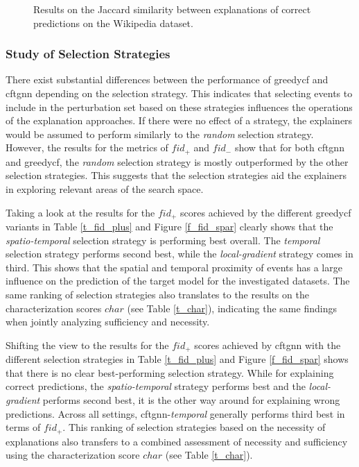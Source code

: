 \begin{figure}[ht]
    \centering
    
    \caption{Results on the Jaccard similarity between explanations of correct predictions on the Wikipedia dataset.}
    \label{f_jaccard_similarity_wiki}
\end{figure}


\FloatBarrier

\subsubsection{Study of Selection Strategies}
\label{s_Evaluation_Results_SelectionStrategies}

There exist substantial differences between the performance of \gls{greedycf} and \gls{cftgnn} depending on the selection strategy. This indicates that selecting events to include in the perturbation set based on these strategies influences the operations of the explanation approaches. If there were no effect of a strategy, the explainers would be assumed to perform similarly to the \textit{random} selection strategy. However, the results for the metrics of $fid_+$ and $fid_-$ show that for both \gls{cftgnn} and \gls{greedycf}, the \textit{random} selection strategy is mostly outperformed by the other selection strategies. This suggests that the selection strategies aid the explainers in exploring relevant areas of the search space.

Taking a look at the results for the $fid_+$ scores achieved by the different \gls{greedycf} variants in Table \ref{t_fid_plus} and Figure \ref{f_fid_spar} clearly shows that the \textit{spatio-temporal} selection strategy is performing best overall. The \textit{temporal} selection strategy performs second best, while the \textit{local-gradient} strategy comes in third. This shows that the spatial and temporal proximity of events has a large influence on the prediction of the target model for the investigated datasets. The same ranking of selection strategies also translates to the results on the characterization scores $char$ (see Table \ref{t_char}), indicating the same findings when jointly analyzing sufficiency and necessity.


Shifting the view to the results for the $fid_+$ scores achieved by \gls{cftgnn} with the different selection strategies in Table \ref{t_fid_plus} and Figure \ref{f_fid_spar} shows that there is no clear best-performing selection strategy. While for explaining correct predictions, the \textit{spatio-temporal} strategy performs best and the \textit{local-gradient} performs second best, it is the other way around for explaining wrong predictions. Across all settings, \gls{cftgnn}-\textit{temporal} generally performs third best in terms of $fid_+$. This ranking of selection strategies based on the necessity of explanations also transfers to a combined assessment of necessity and sufficiency using the characterization score $char$ (see Table \ref{t_char}).

